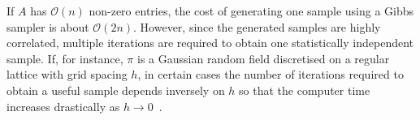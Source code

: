\documentclass[
fontsize=11pt,
paper=a4,
numbers=noenddot
]{scrartcl}
\begin{document}

If $A$ has $\mathcal{O}(n)$ non-zero entries, the cost of generating one sample using a Gibbs sampler is about $\mathcal{O}(2n)$. However, since the generated samples are highly correlated, multiple iterations are required to obtain one statistically independent sample. If, for instance, $\pi$ is a Gaussian random field discretised on a regular lattice with grid spacing $h$, in certain cases the number of iterations required to obtain a useful sample depends inversely on $h$ so that the computer time increases drastically as $h \rightarrow 0$~\cite{goodmansokal,kazashimuellerscheichl}.
\end{document}
